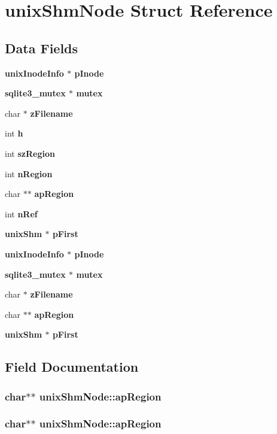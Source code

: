 \section{unix\-Shm\-Node Struct Reference}
\label{structunixShmNode}
\subsection*{Data Fields}
\begin{CompactItemize}
\item 
\bf{unix\-Inode\-Info} $\ast$ \bf{p\-Inode}
\item 
\bf{sqlite3\_\-mutex} $\ast$ \bf{mutex}
\item 
char $\ast$ \bf{z\-Filename}
\item 
int \bf{h}
\item 
int \bf{sz\-Region}
\item 
int \bf{n\-Region}
\item 
char $\ast$$\ast$ \bf{ap\-Region}
\item 
int \bf{n\-Ref}
\item 
\bf{unix\-Shm} $\ast$ \bf{p\-First}
\item 
\bf{unix\-Inode\-Info} $\ast$ \bf{p\-Inode}
\item 
\bf{sqlite3\_\-mutex} $\ast$ \bf{mutex}
\item 
char $\ast$ \bf{z\-Filename}
\item 
char $\ast$$\ast$ \bf{ap\-Region}
\item 
\bf{unix\-Shm} $\ast$ \bf{p\-First}
\end{CompactItemize}


\subsection{Field Documentation}
\subsubsection{\setlength{\rightskip}{0pt plus 5cm}char$\ast$$\ast$ \bf{unix\-Shm\-Node::ap\-Region}}\label{structunixShmNode_9f6e30f176e9a9d287679c90d94f1c59}


\subsubsection{\setlength{\rightskip}{0pt plus 5cm}char$\ast$$\ast$ \bf{unix\-Shm\-Node::ap\-Region}}\label{structunixShmNode_9f6e30f176e9a9d287679c90d94f1c59}


